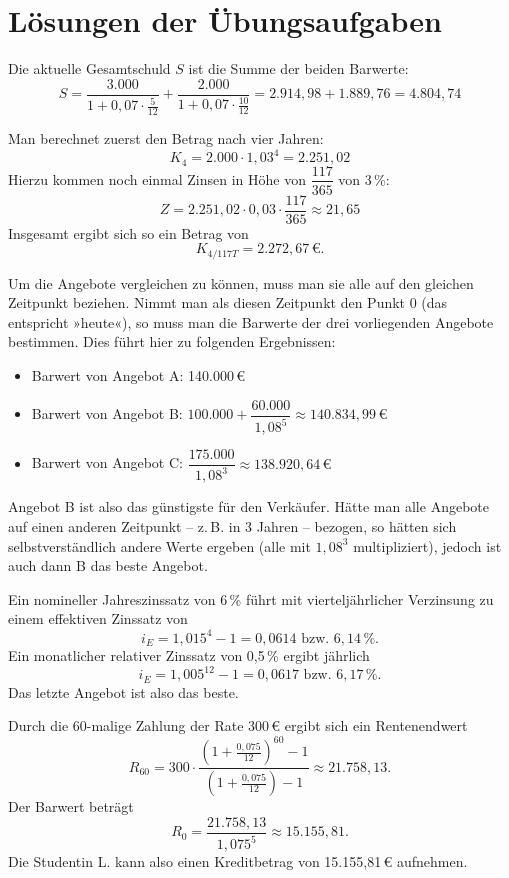 \chapter{Lösungen der Übungsaufgaben}

Die aktuelle Gesamtschuld $S$ ist die Summe der beiden Barwerte:
\[ S = \frac{3.000}{1 + 0{,}07 \cdot \frac{5}{12}} + \frac{2.000}{1 + 0{,}07 \cdot \frac{10}{12}} = 2.914{,}98 + 1.889{,}76 = 4.804{,}74 \]

Man berechnet zuerst den Betrag nach vier Jahren:
\[ K_4 = 2.000 \cdot 1{,}03^4 = 2.251{,}02 \]
Hierzu kommen noch einmal Zinsen in Höhe von $\dfrac{117}{365}$ von 3\,\%:
\[ Z = 2.251{,}02 \cdot 0{,}03 \cdot \frac{117}{365} \approx 21{,}65 \]
Insgesamt ergibt sich so ein Betrag von
\[ K_{4/117T} = 2.272{,}67\,€ . \]

Um die Angebote vergleichen zu können, muss man sie alle auf den gleichen Zeitpunkt beziehen. Nimmt man als diesen Zeitpunkt den Punkt 0 (das entspricht »heute«), so muss man die Barwerte der drei vorliegenden Angebote bestimmen. Dies führt hier zu folgenden Ergebnissen:
\begin{itemize}
  \item Barwert von Angebot A: 140.000\,€
  \item Barwert von Angebot B: $100.000 + \dfrac{60.000}{1{,}08^5} \approx 140.834{,}99\,€$
  \item Barwert von Angebot C: $\dfrac{175.000}{1{,}08^3} \approx 138.920{,}64\,€$
\end{itemize}
Angebot B ist also das günstigste für den Verkäufer. Hätte man alle Angebote auf einen anderen Zeitpunkt -- z.\,B. in 3 Jahren -- bezogen, so hätten sich selbstverständlich andere Werte ergeben (alle mit $1{,}08^3$ multipliziert), jedoch ist auch dann B das beste Angebot.

Ein nomineller Jahreszinssatz von 6\,\% führt mit vierteljährlicher Verzinsung zu einem effektiven Zinssatz von
\[ i_E = 1{,}015^4 - 1 = 0{,}0614 \text{ bzw. } 6{,}14\,\% . \]
Ein monatlicher relativer Zinssatz von 0{,}5\,\% ergibt jährlich
\[ i_E = 1{,}005^{12} - 1 = 0{,}0617 \text{ bzw. } 6{,}17\,\% . \]
Das letzte Angebot ist also das beste.

Durch die 60-malige Zahlung der Rate 300\,€ ergibt sich ein Rentenendwert
\[ R_{60} = 300 \cdot \frac{\left(1 + \frac{0{,}075}{12}\right)^{60} - 1}{\left(1 + \frac{0{,}075}{12}\right) - 1} \approx 21.758{,}13 . \]
Der Barwert beträgt
\[ R_0 = \frac{21.758{,}13}{1{,}075^5} \approx 15.155{,}81 . \]
Die Studentin L. kann also einen Kreditbetrag von 15.155{,}81\,€ aufnehmen.

